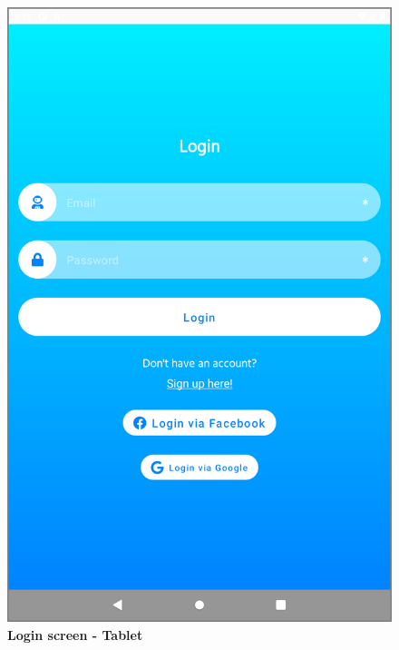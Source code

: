 \begin{figure}[!htb]
\centering
\begin{minipage}{.45\textwidth}
\centering
\includegraphics[width=.95\textwidth]{../Images/UI/LoginBig.jpg}
\caption{\label{fig:dbapiuser}\textbf{Login screen - Tablet}}
\end{minipage} 
\begin{minipage}{.45\textwidth}
\centering

\end{minipage}
\end{figure}
